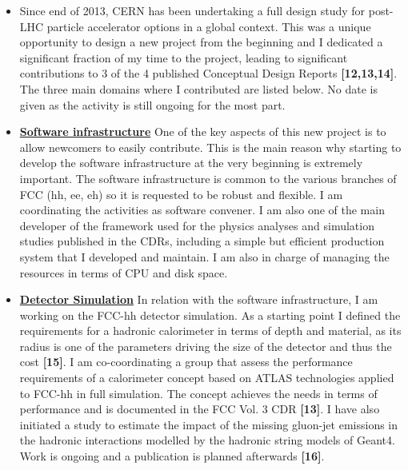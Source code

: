 \documentclass[12pt]{article}
\begin{document}
\begin{itemize}[leftmargin=1.3cm]
\itemsep0.8em

\item[] Since end of 2013, CERN has been undertaking a full design study for post-LHC particle accelerator options in a global context. This was a unique opportunity to design a new project from the beginning and I dedicated a significant fraction of my time to the project, leading to significant contributions to 3 of the 4 published Conceptual Design Reports {\bf \color{red}[12,13,14]}. The three main domains where I contributed are listed below. No date is given as the activity is still ongoing for the most part.

\item[] {\bf \underline{Software infrastructure}}
\vskip 0.2cm
One of the key aspects of this new project is to allow newcomers to easily contribute. This is the main reason why starting to develop the software infrastructure at the very beginning is extremely important. The software infrastructure is common to the various branches of FCC (hh, ee, eh) so it is requested to be robust and flexible. I am coordinating the activities as software convener. I am also one of the main developer of the framework used for the physics analyses and simulation studies published in the CDRs, including a simple but efficient production system that I developed and maintain. I am also in charge of managing the resources in terms of CPU and disk space.


\item[] {\bf \underline{Detector Simulation}}
\vskip 0.2cm
In relation with the software infrastructure, I am working on the FCC-hh detector simulation. 
As a starting point I defined the requirements for a hadronic calorimeter in terms of depth and material, as its radius is one of the parameters driving the size of the detector and thus the cost {\bf \color{red}[15]}. I am co-coordinating a group that assess the performance requirements of a calorimeter concept based on ATLAS technologies applied to FCC-hh in full simulation. The concept achieves the needs in terms of performance and is documented in the FCC Vol. 3 CDR {\bf \color{red}[13]}. I have also initiated a study to estimate the impact of the missing gluon-jet emissions in the hadronic interactions modelled by the hadronic string models of Geant4. Work is ongoing and a publication is planned afterwards {\bf \color{red}[16]}.



\end{itemize}
\end{document}
